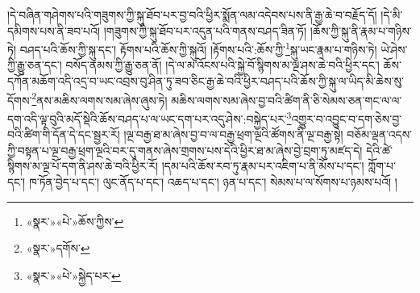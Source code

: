 །དེ་བཞིན་གཤེགས་པའི་གཟུགས་ཀྱི་སྐུ་ཐོབ་པར་བྱ་བའི་ཕྱིར་སྨོན་ལམ་འདེབས་པས་ནི་རྒྱ་ཆེ་བ་བརྗོད་དོ། །དེ་མི་དམིགས་པས་ནི་ཟབ་པའོ། །གཟུགས་ཀྱི་སྐུ་ཐོབ་པར་འདུན་པའི་གནས་བཤད་ཟིན་ཏོ། །ཆོས་ཀྱི་སྐུ་ནི་རྣམ་པ་གཉིས་ཏེ། བཤད་པའི་ཆོས་ཀྱི་སྐུ་དང་། རྟོགས་པའི་ཆོས་ཀྱི་སྐུའོ། །རྟོགས་པའི་:ཆོས་ཀྱི་\footnote{«སྣར་»«པེ་»ཆོས་ཀྱིས་}སྐུ་ཡང་རྣམ་པ་གཉིས་ཏེ། ཡེ་ཤེས་ཀྱི་རྒྱུ་ཅན་དང་། བསོད་ནམས་ཀྱི་རྒྱུ་ཅན་ནོ། །དེ་ལ་མ་འོངས་པའི་སྐྱེ་བོ་སྙིགས་མ་ལྔ་ཤས་ཆེ་བའི་ཕྱིར་དང་། ཆོས་དཀོན་མཆོག་འདི་འདྲ་བ་ཡང་འབྲས་བུ་ཤིན་ཏུ་ཟབ་ཅིང་རྒྱ་ཆེ་བའི་ཕྱིར་བཤད་པའི་ཆོས་ཀྱི་སྐུ་ལ་ཡིད་མི་ཆེས་སུ་དོགས་\footnote{«སྣར་»དགོས་}ནས་མཆིས་ལགས་སམ་ཞེས་ཞུས་ཏེ། མཆིས་ལགས་སམ་ཞེས་བྱ་བའི་ཚིག་ནི་ཅི་སེམས་ཅན་གང་ལ་ལ་དག་འདི་ལྟ་བུའི་མདོ་སྡེའི་ཆོས་བཤད་པ་ལ་ཡང་དག་པར་འདུ་ཤེས་:བསྐྱེད་པར་\footnote{«སྣར་»«པེ་»སྐྱེད་པར་}འགྱུར་བ་འབྱུང་བ་དག་ཅེས་བྱ་བའི་ཚིག་གི་དོན་དེ་དང་སྦྱར་རོ། །ལྔ་བརྒྱ་ཐ་མ་ཞེས་བྱ་བ་ལ་བརྒྱ་ཕྲག་ལྔའི་ཚོགས་ནི་ལྔ་བརྒྱ་སྟེ། བཅོམ་ལྡན་འདས་ཀྱི་བསྟན་པ་ལྔ་བརྒྱ་ཕྲག་ལྔའི་བར་དུ་གནས་ཞེས་གྲགས་པས་དེའི་ཕྱིར་ཐ་མ་ཞེས་བྱེ་བྲག་ཏུ་མཛད་དེ། དེའི་ཚེ་སྙིགས་མ་ལྔ་པོ་དག་ནི་ཤས་ཆེ་བའི་ཕྱིར་རོ། །དམ་པའི་ཆོས་རབ་ཏུ་རྣམ་པར་འཇིག་པ་ནི་མོས་པ་དང་། ཀློག་པ་དང་། ཁ་ཏོན་བྱེད་པ་དང་། ལུང་ནོད་པ་དང་། འཆད་པ་དང་། ཉན་པ་དང་། སེམས་པ་ལ་སོགས་པ་ཉམས་པའོ། །
